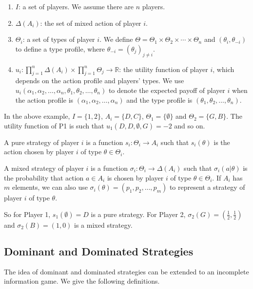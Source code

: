 \documentclass[12pt, oneside]{article}
\begin{document}
\begin{enumerate}
    \item \( I \): a set of players. We assume there are \( n \) players.
    \item \( \Delta(A_i) \): the set of mixed action of player \( i \).
    \item \( \Theta_i \): a set of types of player \( i \). We define \( \Theta = \Theta_1 \times \Theta_2 \times \cdots \times \Theta_n \) and \( (\theta_i, \theta_{-i}) \) to define a type profile, where \( \theta_{-i} = (\theta_j)_{j \neq i} \).
    \item \( u_i : \prod_{j=1}^{n} \Delta(A_i) \times \prod_{j=1}^{n} \Theta_j \to \mathbb{R} \): the utility function of player \( i \), which depends on the action profile and players’ types. We use \( u_i(\alpha_1, \alpha_2, \dots, \alpha_n, \theta_1, \theta_2, \dots, \theta_n) \) to denote the expected payoff of player \( i \) when the action profile is \( (\alpha_1, \alpha_2, \dots, \alpha_n) \) and the type profile is \( (\theta_1, \theta_2, \dots, \theta_n) \).
\end{enumerate}

In the above example, \( I = \{1,2\} \), \( A_i = \{D,C\} \), \( \Theta_1 = \{\emptyset\} \) and \( \Theta_2 = \{G, B\} \). The utility function of P1 is such that \( u_1(D, D, \emptyset, G) = -2 \) and so on.

A pure strategy of player \( i \) is a function \( s_i : \Theta_i \to A_i \) such that \( s_i(\theta) \) is the action chosen by player \( i \) of type \( \theta \in \Theta_i \).

A mixed strategy of player \( i \) is a function \( \sigma_i : \Theta_i \to \Delta(A_i) \) such that \( \sigma_i(a | \theta) \) is the probability that action \( a \in A_i \) is chosen by player \( i \) of type \( \theta \in \Theta_i \). If \( A_i \) has \( m \) elements, we can also use \( \sigma_i(\theta) = (p_1, p_2, \dots, p_m) \) to represent a strategy of player \( i \) of type \( \theta \).

So for Player 1, \( s_1(\emptyset) = D \) is a pure strategy. For Player 2, \( \sigma_2(G) = \left( \frac{1}{2}, \frac{1}{2} \right) \) and \( \sigma_2(B) = (1,0) \) is a mixed strategy.

\subsection{Dominant and Dominated Strategies}
The idea of dominant and dominated strategies can be extended to an incomplete information game. We give the following definitions.
\end{document}
